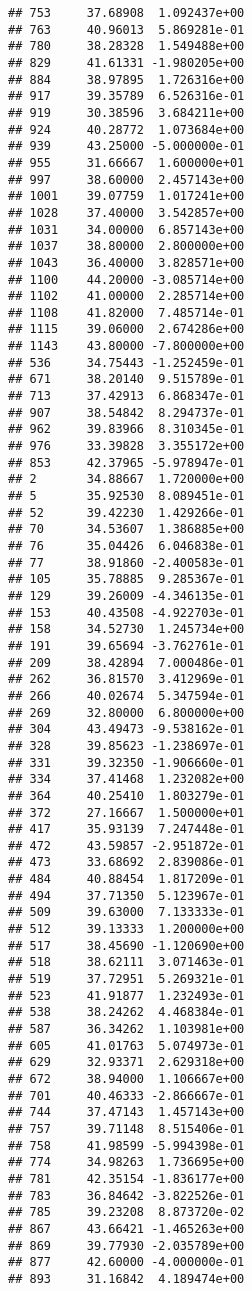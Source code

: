 \documentclass[
]{article}
\begin{document}
\begin{verbatim}
## 753     37.68908  1.092437e+00
## 763     40.96013  5.869281e-01
## 780     38.28328  1.549488e+00
## 829     41.61331 -1.980205e+00
## 884     38.97895  1.726316e+00
## 917     39.35789  6.526316e-01
## 919     30.38596  3.684211e+00
## 924     40.28772  1.073684e+00
## 939     43.25000 -5.000000e-01
## 955     31.66667  1.600000e+01
## 997     38.60000  2.457143e+00
## 1001    39.07759  1.017241e+00
## 1028    37.40000  3.542857e+00
## 1031    34.00000  6.857143e+00
## 1037    38.80000  2.800000e+00
## 1043    36.40000  3.828571e+00
## 1100    44.20000 -3.085714e+00
## 1102    41.00000  2.285714e+00
## 1108    41.82000  7.485714e-01
## 1115    39.06000  2.674286e+00
## 1143    43.80000 -7.800000e+00
## 536     34.75443 -1.252459e-01
## 671     38.20140  9.515789e-01
## 713     37.42913  6.868347e-01
## 907     38.54842  8.294737e-01
## 962     39.83966  8.310345e-01
## 976     33.39828  3.355172e+00
## 853     42.37965 -5.978947e-01
## 2       34.88667  1.720000e+00
## 5       35.92530  8.089451e-01
## 52      39.42230  1.429266e-01
## 70      34.53607  1.386885e+00
## 76      35.04426  6.046838e-01
## 77      38.91860 -2.400583e-01
## 105     35.78885  9.285367e-01
## 129     39.26009 -4.346135e-01
## 153     40.43508 -4.922703e-01
## 158     34.52730  1.245734e+00
## 191     39.65694 -3.762761e-01
## 209     38.42894  7.000486e-01
## 262     36.81570  3.412969e-01
## 266     40.02674  5.347594e-01
## 269     32.80000  6.800000e+00
## 304     43.49473 -9.538162e-01
## 328     39.85623 -1.238697e-01
## 331     39.32350 -1.906660e-01
## 334     37.41468  1.232082e+00
## 364     40.25410  1.803279e-01
## 372     27.16667  1.500000e+01
## 417     35.93139  7.247448e-01
## 472     43.59857 -2.951872e-01
## 473     33.68692  2.839086e-01
## 484     40.88454  1.817209e-01
## 494     37.71350  5.123967e-01
## 509     39.63000  7.133333e-01
## 512     39.13333  1.200000e+00
## 517     38.45690 -1.120690e+00
## 518     38.62111  3.071463e-01
## 519     37.72951  5.269321e-01
## 523     41.91877  1.232493e-01
## 538     38.24262  4.468384e-01
## 587     36.34262  1.103981e+00
## 605     41.01763  5.074973e-01
## 629     32.93371  2.629318e+00
## 672     38.94000  1.106667e+00
## 701     40.46333 -2.866667e-01
## 744     37.47143  1.457143e+00
## 757     39.71148  8.515406e-01
## 758     41.98599 -5.994398e-01
## 774     34.98263  1.736695e+00
## 781     42.35154 -1.836177e+00
## 783     36.84642 -3.822526e-01
## 785     39.23208  8.873720e-02
## 867     43.66421 -1.465263e+00
## 869     39.77930 -2.035789e+00
## 877     42.60000 -4.000000e-01
## 893     31.16842  4.189474e+00

\end{verbatim}
\end{document}
